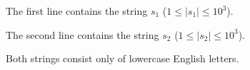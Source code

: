 The first line contains the string $s_1$ ($1 \le |s_1| \le 10^3$).

The second line contains the string $s_2$ ($1 \le |s_2| \le 10^3$).

Both strings consist only of lowercase English letters.

